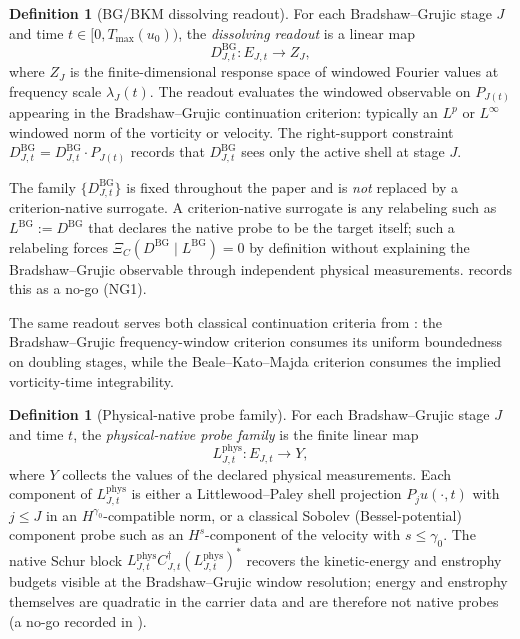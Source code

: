 \documentclass[11pt]{article}
\newcommand{\DBG}{D^{\mathrm{BG}}}
\newcommand{\LBG}{L^{\mathrm{BG}}}
\newcommand{\Lphys}{L^{\mathrm{phys}}}
\newcommand{\Tmax}{T_{\max}}
\newcommand{\lambdaJ}{\lambda_J}
\theoremstyle{definition}
\newtheorem{definition}[theorem]{Definition}
\begin{document}
\begin{definition}[BG/BKM dissolving readout]\label{def:ns:bg-readout}
For each Bradshaw--Grujic stage \(J\) and time
\(t\in[0,\Tmax(u_0))\), the \emph{dissolving readout} is a
linear map
\[
  \DBG_{J,t}\colon E_{J,t}\to Z_J ,
\]
where \(Z_J\) is the finite-dimensional response space of
windowed Fourier values at frequency scale
\(\lambdaJ(t)\).  The readout evaluates the windowed
observable on \(P_{J(t)}\) appearing in the
Bradshaw--Grujic continuation criterion: typically an
\(L^p\) or \(L^\infty\) windowed norm of the vorticity or
velocity.  The right-support constraint
\(\DBG_{J,t}=\DBG_{J,t}\cdot P_{J(t)}\) records that
\(\DBG_{J,t}\) sees only the active shell at stage \(J\).
\end{definition}

The family \(\{\DBG_{J,t}\}\) is fixed throughout the paper and is
\emph{not} replaced by a criterion-native surrogate.  A criterion-native
surrogate is any relabeling such as \(\LBG:=\DBG\) that declares the
native probe to be the target itself; such a relabeling forces
\(\Xi_C(\DBG\mid\LBG)=0\) by definition without explaining the
Bradshaw--Grujic observable through independent physical measurements.
 records this as a no-go (NG1).

The same readout serves both classical continuation criteria from
: the Bradshaw--Grujic frequency-window criterion
consumes its uniform boundedness on doubling stages, while the
Beale--Kato--Majda criterion consumes the implied vorticity-time
integrability.

\begin{definition}[Physical-native probe family]\label{def:ns:physical-native-probes}
For each Bradshaw--Grujic stage \(J\) and time \(t\), the
\emph{physical-native probe family} is the finite linear map
\[
  \Lphys_{J,t}\colon E_{J,t}\to Y ,
\]
where \(Y\) collects the values of the declared physical
measurements.  Each component of \(\Lphys_{J,t}\) is either
a Littlewood--Paley shell projection \(P_j u(\cdot,t)\)
with \(j\le J\) in an \(H^{\gamma_0}\)-compatible norm, or
a classical Sobolev (Bessel-potential) component probe such
as an \(H^s\)-component of the velocity with
\(s\le\gamma_0\).  The native Schur block
\(\Lphys_{J,t}C_{J,t}^{\dagger}(\Lphys_{J,t})^*\) recovers
the kinetic-energy and enstrophy budgets visible at the
Bradshaw--Grujic window resolution; energy and enstrophy
themselves are quadratic in the carrier data and are
therefore not native probes (a no-go recorded in
).
\end{definition}
\end{document}
